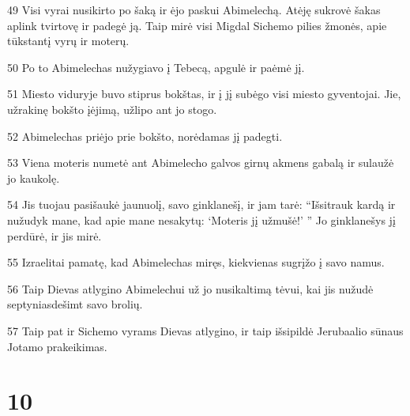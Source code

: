 \par 49 Visi vyrai nusikirto po šaką ir ėjo paskui Abimelechą. Atėję sukrovė šakas aplink tvirtovę ir padegė ją. Taip mirė visi Migdal Sichemo pilies žmonės, apie tūkstantį vyrų ir moterų. 
\par 50 Po to Abimelechas nužygiavo į Tebecą, apgulė ir paėmė jį. 
\par 51 Miesto viduryje buvo stiprus bokštas, ir į jį subėgo visi miesto gyventojai. Jie, užrakinę bokšto įėjimą, užlipo ant jo stogo. 
\par 52 Abimelechas priėjo prie bokšto, norėdamas jį padegti. 
\par 53 Viena moteris numetė ant Abimelecho galvos girnų akmens gabalą ir sulaužė jo kaukolę. 
\par 54 Jis tuojau pasišaukė jaunuolį, savo ginklanešį, ir jam tarė: “Išsitrauk kardą ir nužudyk mane, kad apie mane nesakytų: ‘Moteris jį užmušė!’ ” Jo ginklanešys jį perdūrė, ir jis mirė. 
\par 55 Izraelitai pamatę, kad Abimelechas miręs, kiekvienas sugrįžo į savo namus. 
\par 56 Taip Dievas atlygino Abimelechui už jo nusikaltimą tėvui, kai jis nužudė septyniasdešimt savo brolių. 
\par 57 Taip pat ir Sichemo vyrams Dievas atlygino, ir taip išsipildė Jerubaalio sūnaus Jotamo prakeikimas.



\chapter{10}


